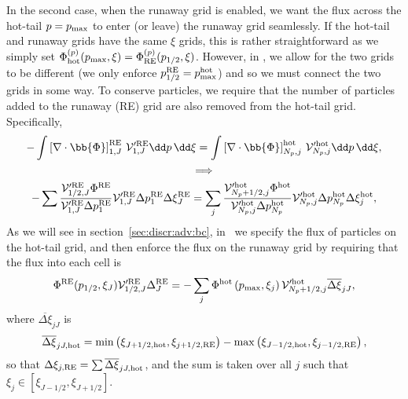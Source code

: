 \documentclass{notes}
\newcommand{\Vp}{\mathcal{V}'}
\begin{document}
    In the second case, when the runaway grid is enabled, we want the flux
    across the hot-tail $p=p_{\rm max}$ to enter (or leave) the runaway grid
    seamlessly. If the hot-tail and runaway grids have the same $\xi$ grids,
    this is rather straightforward as we simply set 
    $\Phi^{(p)}_{\rm hot}(p_{\rm max},\xi) = \Phi^{(p)}_{\rm RE}(p_{1/2},\xi)$.
    However, in \DREAM, we allow for the two grids to be different (we only
    enforce $p^{\rm RE}_{1/2} = p^{\rm hot}_{\rm max}$) and so we must connect
    the two grids in some way. To conserve particles, we require that the
	number of particles added to the runaway (RE) grid are also removed from
	the hot-tail grid. Specifically,
	\begin{equation}\label{eq:fluxCross_origin}
		\begin{gathered}
			-\int \left[\nabla\cdot\bb{\Phi}\right]^{\rm RE}_{1,J}\,\Vp^{\rm RE}_{1,J}\dd p\,\dd\xi =
			\int \left[\nabla\cdot\bb{\Phi}\right]^{\rm hot}_{N_p,j}\,\Vp^{\rm hot}_{N_p,j}\dd p\,\dd\xi,\\
			\implies\\
			-\sum\frac{\Vp^{\rm RE}_{1/2,J}\Phi^{\rm RE}}{\Vp^{\rm RE}_{1,J}\Delta p^{\rm RE}_1}\Vp^{\rm RE}_{1,J}\Delta p^{\rm RE}_1 \Delta\xi^{\rm RE}_J =
			\sum_j\frac{\Vp^{\rm hot}_{N_p+1/2,j}\Phi^{\rm hot}}{\Vp^{\rm hot}_{N_p,j}\Delta p^{\rm hot}_{N_p}}\Vp^{\rm hot}_{N_p,j}\Delta p^{\rm hot}_{N_p}\Delta\xi^{\rm hot}_{j}, %
		\end{gathered}
	\end{equation}
    As we will see in section~\ref{sec:discr:adv:bc}, in \DREAM\ we specify the
    flux of particles on the hot-tail grid, and then enforce the flux on the
    runaway grid by requiring that the flux into each cell is
    \begin{equation}\label{eq:fluxCross}
        \Phi^{\rm RE}(p_{1/2},\xi_J) \Vp^{\rm RE}_{1/2,J} \Delta^{\rm RE}_J =
        -\sum_j \Phi^{\rm hot}\left(p_{\rm max},\xi_j\right) \Vp^{\rm hot}_{N_p+1/2,j} \overline{\Delta\xi}_{jJ},
    \end{equation}
	where $\overline{\Delta\xi}_{jJ}$ is
    \begin{equation}\label{eq:PhiPinterp}
        \overline{\Delta\xi}_{jJ,\rm hot} = \min\left(\xi_{J+1/2,{\rm hot}},\xi_{j+1/2,{\rm RE}}\right) -
        \max\left( \xi_{J-1/2,{\rm hot}}, \xi_{j-1/2,{\rm RE}} \right),
    \end{equation}
    so that $\Delta\xi_{j,\rm RE} = \sum\overline{\Delta\xi}_{jJ,\rm hot}$, and
	the sum is taken over all $j$ such that $\xi_j\in[\xi_{J-1/2}, \xi_{J+1/2}]$.
\end{document}
